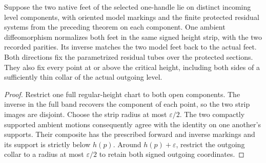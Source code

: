 \begin{theorem}
\label{thm:ed03-marked-edge-feet}
\leanok
Suppose the two native feet of the selected one-handle lie on distinct
incoming level components, with oriented model markings and the finite
protected residual systems from the preceding theorem on each component.
One ambient diffeomorphism normalizes both feet in the same signed
height strip, with the two recorded parities. Its inverse matches the
two model feet back to the actual feet. Both directions fix the
parametrized residual tubes over the protected sections. They also fix
every point at or above the critical height, including both sides of a
sufficiently thin collar of the actual outgoing level.
\end{theorem}
\begin{proof}
\leanok
Restrict one full regular-height chart to both open components. The inverse
in the full band recovers the component of each point, so the two strip
images are disjoint. Choose the strip radius at most $\varepsilon/2$.
The two compactly supported ambient motions consequently agree with the
identity on one another's supports. Their composite has the prescribed
forward and inverse markings and its support is strictly below $h(p)$.
Around $h(p)+\varepsilon$, restrict the outgoing collar to a radius at most
$\varepsilon/2$ to retain both signed outgoing coordinates.
\end{proof}

